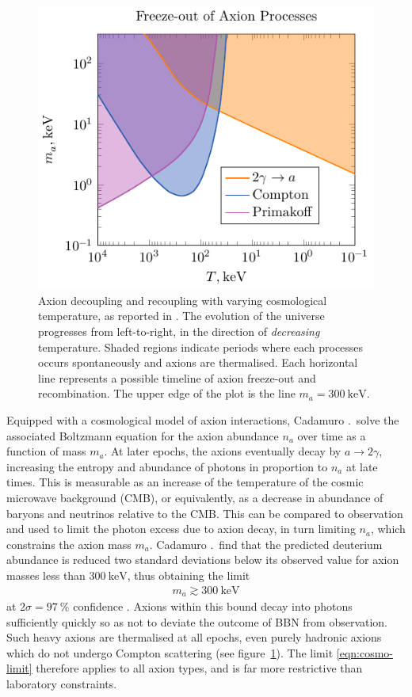 \begin{figure}
	\centering
	\includegraphics{diagrams/cosmo-freeze-out.pdf}
	\caption{
		Axion decoupling and recoupling with varying cosmological temperature, as reported in \cite{Cadamuro_2011}.
		The evolution of the universe progresses from left-to-right, in the direction of \emph{decreasing} temperature.
		Shaded regions indicate periods where each processes occurs spontaneously and axions are thermalised.
		Each horizontal line represents a possible timeline of axion freeze-out and recombination.
		The upper edge of the plot is the line $m_a = \SI{300}{\kilo\eV}$.
	}
	\label{fig:axion-freeze-out}
\end{figure}


Equipped with a cosmological model of axion interactions, Cadamuro \etal.\ solve the associated Boltzmann equation for the axion abundance $n_a$ over time as a function of mass $m_a$.
At later epochs, the axions eventually decay by $a \to 2γ$, increasing the entropy and abundance of photons in proportion to $n_a$ at late times.
This is measurable as an increase of the temperature of the cosmic microwave background (CMB), or equivalently, as a decrease in abundance of baryons and neutrinos relative to the CMB.
This can be compared to observation and used to limit the photon excess due to axion decay, in turn limiting $n_a$, which constrains the axion mass $m_a$.
Cadamuro \etal.\ find that the predicted deuterium abundance is reduced two standard deviations below its observed value for axion masses less than $\SI{300}{\kilo\eV}$, thus obtaining the limit
\begin{align}
	m_a \gtrsim \SI{300}{\kilo\eV}
	\label{eqn:cosmo-limit}
\end{align}
at $2σ = \SI{97}{\percent}$ confidence \cite{Cadamuro_2011}.
Axions within this bound decay into photons sufficiently quickly so as not to deviate the outcome of BBN from observation.
Such heavy axions are thermalised at all epochs, even purely hadronic axions which do not undergo Compton scattering (see figure~\ref{fig:axion-freeze-out}).
The limit \eqref{eqn:cosmo-limit} therefore applies to all axion types, and is far more restrictive than laboratory constraints.



